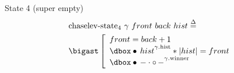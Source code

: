 
\begin{frame}{State 4 (super empty)}
\begin{align*}
		&\mathrm{chaselev \mathhyphen state_4}\ \gamma\ front\ back\ hist
		\eqdef
	\\
		&\iBigsep\left[\begin{array}{l}
				front = back + 1
			\\
				\iGhost{\gamma\mathrm{.hist}}{\iAuth{hist}} \iSep
				| hist | = front
			\\
				\iGhost{\gamma\mathrm{.winner}}{\iAuth{-} \cdot \iFrag{-}}
		\end{array}\right.
\end{align*}
\end{frame}